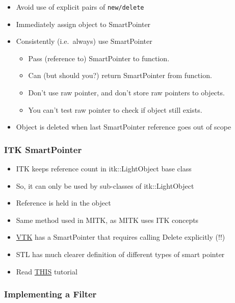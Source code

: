 \begin{itemize}
\itemsep1pt\parskip0pt
\item
  Avoid use of explicit pairs of \texttt{new/delete}
\item
  Immediately assign object to SmartPointer
\item
  Consistently (i.e.~always) use SmartPointer

  \begin{itemize}
  \itemsep1pt\parskip0pt
  \item
    Pass (reference to) SmartPointer to function.
  \item
    Can (but should you?) return SmartPointer from function.
  \item
    Don't use raw pointer, and don't store raw pointers to objects.
  \item
    You can't test raw pointer to check if object still exists.
  \end{itemize}
\item
  Object is deleted when last SmartPointer reference goes out of scope
\end{itemize}

\subsubsection{ITK SmartPointer}\label{itk-smartpointer}

\begin{itemize}
\itemsep1pt\parskip0pt
\item
  ITK keeps reference count in itk::LightObject base class
\item
  So, it can only be used by sub-classes of itk::LightObject
\item
  Reference is held in the object
\item
  Same method used in MITK, as MITK uses ITK concepts
\item
  \href{http://www.vtk.org}{VTK} has a SmartPointer that requires
  calling Delete explicitly (!!)
\item
  STL has much clearer definition of different types of smart pointer
\item
  Read
  \href{http://www.umich.edu/~eecs381/handouts/C++11_smart_ptrs.pdf}{THIS}
  tutorial
\end{itemize}

\subsubsection{Implementing a Filter}\label{implementing-a-filter}

